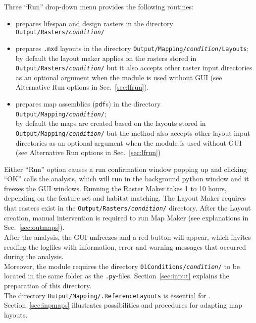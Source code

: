 Three ``Run'' drop-down menu provides the following routines:
\begin{itemize}
\item {} prepares lifespan and design rasters in the directory \texttt{Output/Rasters/\textit{condition}/}
\item {} prepares \texttt{.mxd} layouts in the directory \texttt{Output/Mapping/\textit{condition}/Layouts};\\
by default the layout maker applies on the rasters stored in \texttt{Output/Rasters/\textit{condition}/} but it also accepts other raster input directories as an optional argument when the module is used without GUI (see Alternative Run options in Sec.~\ref{sec:lfrun}).
\item {} prepares map assemblies (\texttt{pdf}s) in the directory \texttt{Output/Mapping/\textit{condition}/};\\
by default the maps are created based on the layouts stored in \texttt{Output/Mapping/\textit{condition}/} but the method also accepts other layout input directories as an optional argument when the module is used without GUI (see Alternative Run options in Sec.~\ref{sec:lfrun})
\end{itemize}

Either ``Run'' option causes a run confirmation window popping up and clicking ``OK'' calls the analysis, which will run in the background python window and it freezes the GUI windows. Running the Raster Maker takes 1 to 10 hours, depending on the feature set and habitat matching. The Layout Maker requires that rasters exist in the \texttt{Output/Rasters/\textit{condition}/} directory. After the Layout creation, manual intervention is required to run Map Maker (see explanations in Sec.~\ref{sec:outmaps}).\\

After the analysis, the GUI unfreezes and a red button will appear, which invites reading the logfiles with information, error and warning messages that occurred during the analysis.\\

Moreover, the module requires the directory \texttt{01{\myUnderscore}Conditions/\textit{condition}/} to be located in the same folder as the \texttt{.py}-files. Section~\ref{sec:input} explains the preparation of this directory.\\
The directory \texttt{Output/Mapping/.ReferenceLayouts} is essential for . Section~\ref{sec:inpmaps} illustrates possibilities and procedures for adapting map layouts.\\


